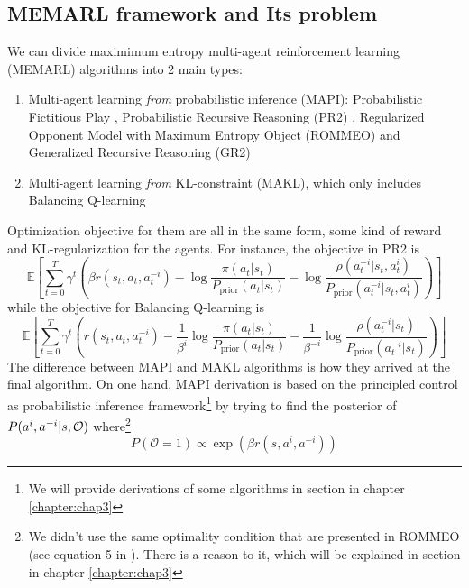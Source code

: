 \subsection{MEMARL framework and Its problem}
\label{sec:chap1-MEMARL-And-Problem}
We can divide maximimum entropy multi-agent reinforcement learning (MEMARL) algorithms into 2 main types: 
\begin{enumerate}
    \item Multi-agent learning \textit{from} probabilistic inference (MAPI): Probabilistic Fictitious Play \cite{rezek2005unifying}, Probabilistic Recursive Reasoning (PR2) \cite{wen2019probabilistic} , Regularized Opponent Model with Maximum Entropy Object (ROMMEO) \cite{tian2019regularized} and Generalized Recursive Reasoning (GR2) \cite{wen2019multi}
    \item Multi-agent learning \textit{from} KL-constraint (MAKL), which only includes Balancing Q-learning \cite{grau2018balancing}
\end{enumerate}
Optimization objective for them are all in the same form, some kind of reward and KL-regularization for the agents. For instance, the objective in PR2 is 
\begin{equation}
    \mathbb{E}\left[ \sum^T_{t=0} \gamma^t \left(\beta r(s_t, a_t, a^{-i}_t) - \log\frac{\pi(a_t|s_t)}{P_{\operatorname{prior}}(a_t|s_t)} -\log \frac{\rho(a^{-i}_t|s_t, a^i_t)}{P_{\operatorname{prior}}(a^{-i}_t|s_t, a^i_t)} \right) \right]
\end{equation}
while the objective for Balancing Q-learning is 
\begin{equation}
    \mathbb{E}\left[ \sum^T_{t=0} \gamma^t \left(r(s_t, a_t, a^{-i}_t) - \frac{1}{\beta^i} \log\frac{\pi(a_t|s_t)}{P_{\operatorname{prior}}(a_t|s_t)} - \frac{1}{\beta^{-i}}\log \frac{\rho(a^{-i}_t|s_t)}{P_{\operatorname{prior}}(a^{-i}_t|s_t)} \right) \right]
\end{equation}
The difference between MAPI and MAKL algorithms is how they arrived at the final algorithm. On one hand, MAPI derivation is based on the principled control as probabilistic inference framework\footnote{We will provide derivations of some algorithms in section  in chapter \ref{chapter:chap3}} by trying to find the posterior of $P(a^i, a^{-i} | s, \mathcal{O})$ where\footnote{We didn't use the same optimality condition that are presented in ROMMEO (see equation 5 in \cite{tian2019regularized}). There is a reason to it, which will be explained in section in chapter \ref{chapter:chap3}} 
\begin{equation}
    P(\mathcal{O} = 1) \propto \exp\left( \beta r(s, a^i, a^{-i}) \right)
\end{equation}
